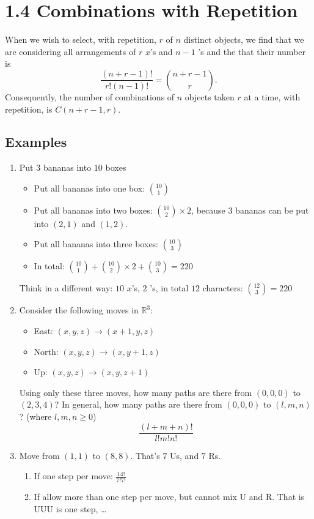 \documentclass[letter]{book}
\begin{document}
\section*{1.4 Combinations with Repetition}
When we wish to select, with repetition, $r$ of $n$ distinct objects, we find that we are considering all arrangements of $r$ $x$'s and $n-1$ \textbar 's and the that their number is
$$
\frac{(n+r-1)!}{r!(n-1)!}=\binom{n+r-1}{r}.
$$
Consequently, the number of combinations of $n$ objects taken $r$ at a time, with repetition, is $C(n+r-1,r)$.
\subsection*{Examples}
\begin{enumerate}
    \item Put $3$ bananas into $10$ boxes
    \begin{itemize}
        \item Put all bananas into one box: $\binom{10}{1}$
        \item Put all bananas into two boxes: $\binom{10}{2}\times 2$, because $3$ bananas can be put into $(2,1)$ and $(1,2)$.
        \item Put all bananas into three boxes: $\binom{10}{3}$
        \item In total: $\binom{10}{1}+\binom{10}{2}\times 2+\binom{10}{3}=220$
    \end{itemize}
    Think in a different way: $10$ $x$'s, $2$ \textbar 's, in total $12$ characters: $\binom{12}{3}=220$
    \item Consider the following moves in $\mathbb{R}^3$:
    \begin{itemize}
        \item East: $(x,y,z)\rightarrow (x+1,y,z)$
        \item North: $(x,y,z)\rightarrow (x,y+1,z)$
        \item Up: $(x,y,z)\rightarrow (x,y,z+1)$
    \end{itemize}
    Using only these three moves, how many paths are there from $(0,0,0)$ to $(2,3,4)$? In general, how many paths are there from $(0,0,0)$ to $(l,m,n)$? (where $l,m,n\geq0$)\\
    $$
    \frac{(l+m+n)!}{l!m!n!}
    $$ 
    \item Move from $(1,1)$ to $(8,8)$. That's $7$ Us, and $7$ Rs.
    \begin{enumerate}
        \item If one step per move: $\frac{14!}{7!7!}$
        \item If allow more than one step per move, but cannot mix U and R. That is UUU is one step, \ldots\\

\end{enumerate}
\end{enumerate}
\end{document}
